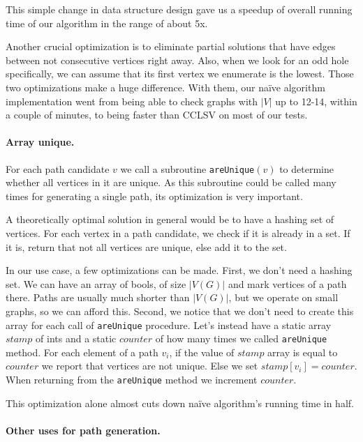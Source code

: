 This simple change in data structure design gave us a speedup of overall running time of our algorithm in the range of about 5x.

Another crucial optimization is to eliminate partial solutions that have edges between not consecutive vertices right away. Also, when we look for an odd hole specifically, we can assume that its first vertex we enumerate is the lowest. Those two optimizations make a huge difference. With them, our na\"ive algorithm implementation went from being able to check graphs with $|V|$ up to 12-14, within a couple of minutes, to being faster than CCLSV on most of our tests.

\paragraph{Array unique.}

For each path candidate $v$ we call a subroutine \texttt{areUnique}$(v)$ to determine whether all vertices in it are unique. As this subroutine could be called many times for generating a single path, its optimization is very important.

A theoretically optimal solution in general would be to have a hashing set of vertices. For each vertex in a path candidate, we check if it is already in a set. If it is, return that not all vertices are unique, else add it to the set.

In our use case, a few optimizations can be made. First, we don't need a hashing set. We can have an array of bools, of size $|V(G)|$ and mark vertices of a path there. Paths are usually much shorter than $|V(G)|$, but we operate on small graphs, so we can afford this. Second, we notice that we don't need to create this array for each call of \texttt{areUnique} procedure. Let's instead have a static array $stamp$ of ints and a static $counter$ of how many times we called \texttt{areUnique} method. For each element of a path $v_i$, if the value of $stamp$ array is equal to $counter$ we report that vertices are not unique. Else we set $stamp[v_i] = counter$. When returning from the \texttt{areUnique} method we increment $counter$.

This optimization alone almost cuts down na\"ive algorithm's running time in half.

\paragraph{Other uses for path generation.}
\label{sec:usesGeneration}

